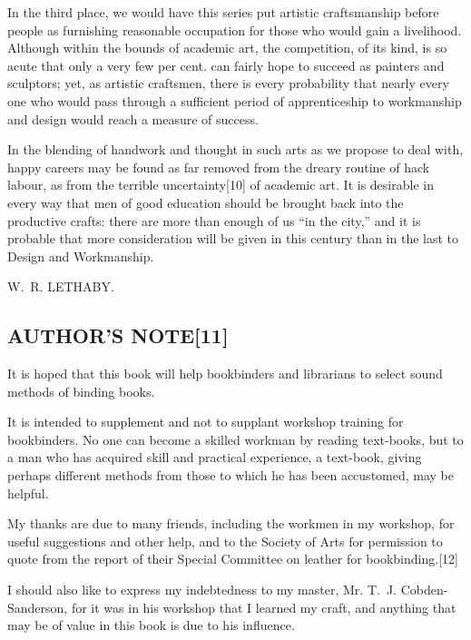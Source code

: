 \documentclass[
]{article}
\begin{document}
In the third place, we would have this series put artistic craftsmanship
before people as furnishing reasonable occupation for those who would
gain a livelihood. Although within the bounds of academic art, the
competition, of its kind, is so acute that only a very few per cent. can
fairly hope to succeed as painters and sculptors; yet, as artistic
craftsmen, there is every probability that nearly every one who would
pass through a sufficient period of apprenticeship to workmanship and
design would reach a measure of success.

In the blending of handwork and thought in such arts as we propose to
deal with, happy careers may be found as far removed from the dreary
routine of hack labour, as from the terrible
uncertainty{\protect\hypertarget{Page_10}{}{{[}10{]}}} of academic art.
It is desirable in every way that men of good education should be
brought back into the productive crafts: there are more than enough of
us ``in the city,'' and it is probable that more consideration will be
given in this century than in the last to Design and Workmanship.

W.~R. LETHABY.

\hypertarget{authors-note11}{%
\subsection[AUTHOR'S
NOTE]{\texorpdfstring{\protect\hypertarget{AUTHORS_NOTE}{}{}AUTHOR'S
NOTE{\protect\hypertarget{Page_11}{}{{[}11{]}}}}{AUTHOR'S NOTE{[}11{]}}}\label{authors-note11}}

{It} is hoped that this book will help bookbinders and librarians to
select sound methods of binding books.

It is intended to supplement and not to supplant workshop training for
bookbinders. No one can become a skilled workman by reading text-books,
but to a man who has acquired skill and practical experience, a
text-book, giving perhaps different methods from those to which he has
been accustomed, may be helpful.

My thanks are due to many friends, including the workmen in my workshop,
for useful suggestions and other help, and to the Society of Arts for
permission to quote from the report of their Special Committee on
leather for bookbinding.{\protect\hypertarget{Page_12}{}{{[}12{]}}}

I should also like to express my indebtedness to my master, Mr. T.~J.
Cobden-Sanderson, for it was in his workshop that I learned my craft,
and anything that may be of value in this book is due to his influence.
\end{document}
